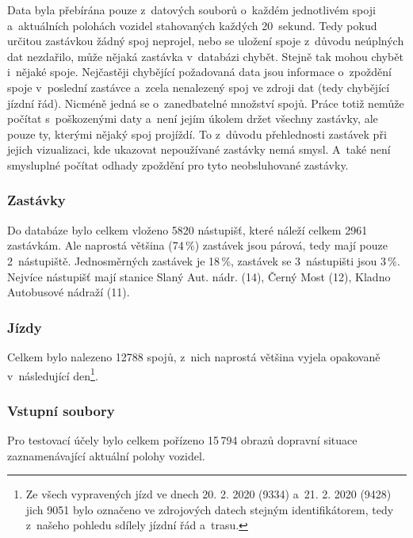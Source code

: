 \bigbreak

Data byla přebírána pouze z~datových souborů o~každém jednotlivém spoji a~aktuálních polohách vozidel stahovaných každých 20~sekund. Tedy pokud určitou zastávkou žádný spoj neprojel, nebo se uložení spoje z~důvodu neúplných dat nezdařilo, může nějaká zastávka v~databázi chybět. Stejně tak mohou chybět i~nějaké spoje. Nejčastěji chybějící požadovaná data jsou informace o~zpoždění spoje v~poslední zastávce a~zcela nenalezený spoj ve zdroji dat (tedy chybějící jízdní řád). Nicméně jedná se o~zanedbatelné množství spojů. Práce totiž nemůže počítat s~poškozenými daty a~není jejím úkolem držet všechny zastávky, ale pouze ty, kterými nějaký spoj projíždí. To z~důvodu přehlednosti zastávek při jejich vizualizaci, kde ukazovat nepoužívané zastávky nemá smysl. A~také není smysluplné počítat odhady zpoždění pro tyto neobsluhované zastávky.

\subsubsection{Zastávky} \label{subsubsection:zastavky}

Do databáze bylo celkem vloženo 5820 nástupišť, které náleží celkem 2961 zastávkám. Ale naprostá většina (74\,\%) zastávek jsou párová, tedy mají pouze 2~nástupiště. Jednosměrných zastávek je 18\,\%, zastávek se 3~nástupišti jsou 3\,\%. Nejvíce nástupišť mají stanice Slaný Aut. nádr. (14), Černý Most (12), Kladno Autobusové nádraží (11).

\subsubsection{Jízdy}

Celkem bylo nalezeno 12788 spojů, z~nich naprostá většina vyjela opakovaně v~následující den\footnote{Ze všech vypravených jízd ve dnech 20. 2. 2020 (9334) a~21. 2. 2020 (9428) jich 9051 bylo označeno ve zdrojových datech stejným identifikátorem, tedy z~našeho pohledu sdílely jízdní řád a~trasu.}.

\subsubsection{Vstupní soubory} \label{subsubsection:vstupni_soubory}

Pro testovací účely bylo celkem pořízeno 15\,794 obrazů dopravní situace zaznamenávající aktuální polohy vozidel.

\bigbreak


